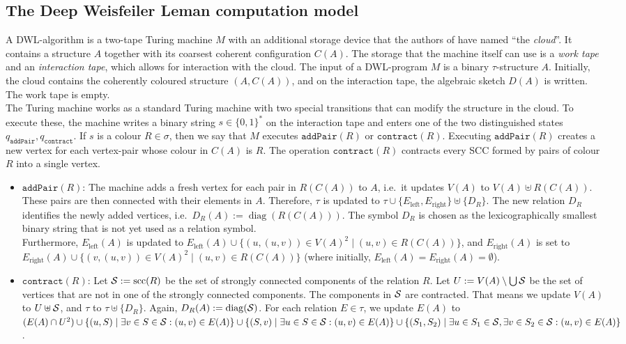 \documentclass[10pt,a4paper]{article}
\newcommand{\Ss}{{\cal S}}
\newcommand{\pairOp }{\texttt{addPair}}
\newcommand{\sccOp }{\texttt{contract}}
\newcommand{\scc}{{\operatorname{scc}}}
\newcommand{\diag}{{\operatorname{diag}}}
\begin{document}
	\subsection{The Deep Weisfeiler Leman computation model} 
	\label{sec:PC_DWLdefinition}
	A DWL-algorithm is a two-tape Turing machine $M$ with an additional storage device that the authors of \cite{dwl} have named ``the \emph{cloud}''. It contains a structure $A$ together with its coarsest coherent configuration $C(A)$.
	The storage that the machine itself can use is a \emph{work tape} and an \emph{interaction tape}, which allows for interaction with the cloud. The input of a DWL-program $M$ is a binary $\tau$-structure $A$. Initially, the cloud contains the coherently coloured structure $(A, C(A))$, and on the interaction tape, the algebraic sketch $D(A)$ is written. The work tape is empty.\\
	The Turing machine works as a standard Turing machine with two special transitions that can modify the structure in the cloud. To execute these, the machine writes a binary string $s \in \{0,1\}^*$ on the interaction tape and enters one of the two distinguished states $q_{\pairOp}, q_{\sccOp}$. If $s$ is a colour $R \in \sigma$, then we say that $M$ executes $\pairOp(R)$ or $\sccOp(R)$. Executing $\pairOp(R)$ creates a new vertex for each vertex-pair whose colour in $C(A)$ is $R$. The operation $\sccOp(R)$ contracts every SCC formed by pairs of colour $R$ into a single vertex.
	\begin{itemize}
		\item $\pairOp(R)$: The machine adds a fresh vertex for each pair in $R(C(A))$ to $A$, i.e.\ it updates $V(A)$ to $V(A) \uplus R(C(A))$. These pairs are then connected with their elements in $A$. Therefore, $\tau$ is updated to $\tau \cup \{E_{\text{left}},E_{\text{right}}\} \uplus \{D_R\}$. The new relation $D_R$ identifies the newly added vertices, i.e.\ $D_R(A) := \diag(R(C(A)))$. The symbol $D_R$ is chosen as the lexicographically smallest binary string that is not yet used as a relation symbol.\\
		Furthermore, $E_{\text{left}}(A)$ is updated to $E_{\text{left}}(A) \cup \{(u,(u,v)) \in V(A)^2 \mid (u,v) \in R(C(A))  \}$, and $E_{\text{right}}(A)$ is set to $E_{\text{right}}(A) \cup \{(v,(u,v)) \in V(A)^2 \mid (u,v) \in R(C(A))  \}$ (where initially, $E_{\text{left}}(A) = E_{\text{right}}(A) = \emptyset$).
		\item $\sccOp(R)$: Let $\Ss := \scc(R)$ be the set of strongly connected components of the relation $R$. Let $U := V(A) \setminus \bigcup \Ss$ be the set of vertices that are not in one of the strongly connected components. The components in $\Ss$ are contracted. That means we update $V(A)$ to $U \uplus \Ss$, and $\tau$ to $\tau \uplus \{D_R\}$. Again, $D_R(A) := \diag(\Ss)$. For each relation $E \in \tau$, we update $E(A)$ to $(E(A) \cap U^2) \cup \{(u,S) \mid \exists v \in S \in \Ss: (u,v) \in E(A)  \} \cup \{ (S,v) \mid  \exists u \in S \in \Ss: (u,v) \in E(A) \} \cup \{ (S_1,S_2) \mid \exists u \in S_1 \in \Ss, \exists v \in S_2 \in \Ss: (u,v) \in E(A)  \}$. 
	\end{itemize}
\end{document}
